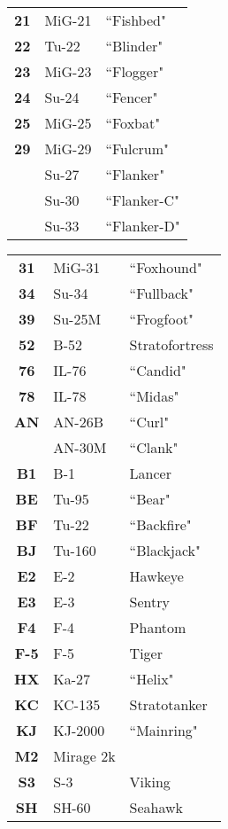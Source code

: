 \documentclass[fontInter]{TechCheck}
\begin{document}
\begin{multicols*}{2}
\begin{center}
\begin{tabular}{c | p{1.5cm}  p{2.5cm}}
				\textbf{21} & MiG-21 & ``Fishbed" \\
				\textbf{22} & Tu-22 & ``Blinder" \\
				\textbf{23} & MiG-23 & ``Flogger" \\
				\textbf{24} & Su-24 & ``Fencer" \\
				\textbf{25} & MiG-25 & ``Foxbat" \\
				\midrule
				\textbf{29} & MiG-29 & ``Fulcrum" \\
				& Su-27 & ``Flanker" \\
				& Su-30 & ``Flanker-C" \\
				& Su-33 & ``Flanker-D" \\
				\midrule
			\end{tabular}
		\end{center}
		\columnbreak

		\begin{center}
			\begin{tabular}{c | p{1.5cm}  p{2.5cm}}
				\midrule
				\textbf{31} & MiG-31 & ``Foxhound" \\
				\textbf{34} & Su-34 & ``Fullback" \\
				\textbf{39} & Su-25M & ``Frogfoot" \\
				\midrule
				\textbf{52} & B-52 & Stratofortress \\
				\midrule
				\textbf{76} & IL-76 & ``Candid" \\
				\textbf{78} & IL-78 & ``Midas" \\
				\textbf{AN} & AN-26B & ``Curl" \\
				& AN-30M & ``Clank" \\
				\midrule
				\textbf{B1} & B-1 & Lancer \\
				\midrule
				\textbf{BE} & Tu-95 & ``Bear" \\
				\textbf{BF} & Tu-22 & ``Backfire" \\
				\textbf{BJ} & Tu-160 & ``Blackjack" \\
				\midrule
				\textbf{E2} & E-2 & Hawkeye \\
				\textbf{E3} & E-3 & Sentry \\
				\midrule
				\textbf{F4} & F-4 & Phantom \\
				\textbf{F-5} & F-5 & Tiger \\
				\midrule
				\textbf{HX} & Ka-27 & ``Helix" \\
				\midrule
				\textbf{KC} & KC-135 & Stratotanker \\
				\midrule
				\textbf{KJ} & KJ-2000 & ``Mainring" \\
				\textbf{M2} & Mirage 2k & \\
				\midrule
				\textbf{S3} & S-3 & Viking\\
				\textbf{SH} & SH-60 & Seahawk \\
				\bottomrule
			\end{tabular}
		\end{center}
	\end{multicols*}
\end{document}

